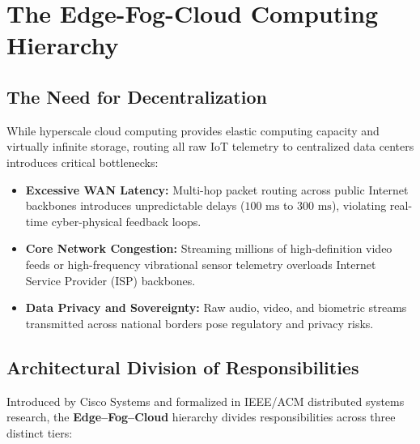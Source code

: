 \documentclass[11pt,a4paper,openany]{report}
\begin{document}
\section{The Edge-Fog-Cloud Computing Hierarchy}
\subsection{The Need for Decentralization}
While hyperscale cloud computing provides elastic computing capacity and virtually infinite storage, routing all raw IoT telemetry to centralized data centers introduces critical bottlenecks:
\begin{itemize}[leftmargin=*]
  \item \textbf{Excessive WAN Latency:} Multi-hop packet routing across public Internet backbones introduces unpredictable delays ($100\text{ ms}$ to $300\text{ ms}$), violating real-time cyber-physical feedback loops.
  \item \textbf{Core Network Congestion:} Streaming millions of high-definition video feeds or high-frequency vibrational sensor telemetry overloads Internet Service Provider (ISP) backbones.
  \item \textbf{Data Privacy and Sovereignty:} Raw audio, video, and biometric streams transmitted across national borders pose regulatory and privacy risks.
\end{itemize}

\subsection{Architectural Division of Responsibilities}
Introduced by Cisco Systems and formalized in IEEE/ACM distributed systems research, the \textbf{Edge--Fog--Cloud} hierarchy divides responsibilities across three distinct tiers:
\end{document}
